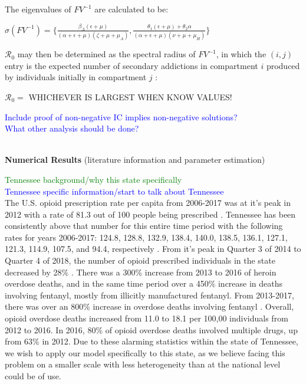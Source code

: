 \documentclass[12pt]{article}
\begin{document}
The eigenvalues of $FV^{-1}$ are calculated to be: 
\begin{center}
$\sigma (FV^{-1}) = \{ \frac{\beta_A(\epsilon+\mu)}{(\alpha+\epsilon+\mu)(\zeta+\mu+\mu_A)}, \frac{\theta_1(\epsilon+\mu)+\theta_2 \alpha}{(\alpha+\epsilon+\mu)(\nu+\mu+\mu_H)} \}$
\end{center}

$\mathscr{R}_0$ may then be determined as the spectral radius of $FV^{-1}$, in which the $(i,j)$ entry is the expected number of secondary addictions in compartment $i$ produced by individuals initially in compartment $j$ :
\begin{center}
$\mathscr{R}_0=$ WHICHEVER IS LARGEST WHEN KNOW VALUES! 
\end{center}

\textcolor{blue}{Include proof of non-negative IC implies non-negative solutions?} \\ 
\textcolor{blue}{What other analysis should be done?} \\ \\

\pagebreak

\textbf{Numerical Results} 
(literature information and parameter estimation) 
 
 \textcolor{green}{Tennessee background/why this state specifically } \\
\textcolor{blue}{Tennessee specific information/start to talk about Tennessee} \\
The U.S. opioid prescription rate per capita from 2006-2017 was at it's peak in 2012 with a rate of 81.3 out of 100 people being prescribed \cite{CDC8}. Tennessee has been consistently above that number for this entire time period with the following rates for years 2006-2017: 124.8, 128.8, 132.9, 138.4, 140.0, 138.5, 136.1, 127.1, 121.3, 114.9, 107.5, and 94.4, respectively \cite{CDC9}. From it's peak in Quarter 3 of 2014 to Quarter 4 of 2018, the number of opioid prescribed individuals in the state decreased by 28\% \cite{PDO}. There was a 300\% increase from 2013 to 2016 of heroin overdose deaths, and in the same time period over a 450\% increase in deaths involving fentanyl, mostly from illicitly manufactured fentanyl. From 2013-2017, there was over an 800\% increase in overdose deaths involving fentanyl \cite{PDO2}. Overall, opioid overdose deaths increased from 11.0 to 18.1 per 100,00 individuals from 2012 to 2016. In 2016, 80\% of opioid overdose deaths involved multiple drugs, up from 63\% in 2012. Due to these alarming statistics within the state of Tennessee, we wish to apply our model specifically to this state, as we believe facing this problem on a smaller scale with less heterogeneity than at the national level could be of use. 
\end{document}
